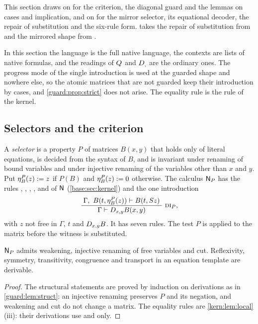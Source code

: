 This section draws on  for the criterion, the diagonal
guard and the lemmas on cases and implication, and on 
for the mirror selector, its equational decoder, the repair of
substitution and the six-rule form.   takes the repair of
substitution from  and the mirrored shape from
.

In this section the language is the full native language, the contexts are
lists of native formulas, and the readings of $Q_{}$ and $D_{,}$ are the
ordinary ones.  The progress mode of the single introduction is used at the
guarded shape and nowhere else, so the atomic matrices that are not guarded
keep their introduction by cases, and \cref{guard:prop:strict} does not
arise.  The equality rule is the rule  of the kernel.

\subsection{Selectors and the criterion}

\begin{definition}[Selector]
\label{guard:def:selector}
A \emph{selector} is a property $P$ of matrices $B(x,y)$ that holds only of
literal equations, is decided from the syntax of $B$, and is invariant under
renaming of bound variables and under injective renaming of the variables
other than $x$ and $y$.  Put $\eta^{P}_B(z)\mathrel{:=} z$ if $P(B)$ and
$\eta^{P}_B(z)\mathrel{:=} 0$ otherwise.  The calculus $\mathsf{N}_P$ has the rules
, , , , 
and  of $\mathsf{N}$ (\cref{base:sec:kernel}) and the one
introduction
\[
 \infrule{\Gamma,\ B(t,\eta^{P}_B(z))\proves B(t,\Suc z)}
         {\Gamma\proves\D{x}{y}B(x,y)}\ \rulename{DI}_{P},
\]
with $z$ not free in $\Gamma$, $t$ and $D_{x,y}B$.  It has seven rules.
The test $P$ is applied to the matrix before the witness is substituted.
\end{definition}

\begin{lemma}
\label{guard:lem:np-struct}
$\mathsf{N}_P$ admits weakening, injective renaming of free variables and cut.
Reflexivity, symmetry, transitivity, congruence and transport in an equation
template are derivable.
\end{lemma}

\begin{proof}
The structural statements are proved by induction on derivations as in
\cref{guard:lem:struct}: an injective renaming preserves $P$ and its
negation, and weakening and cut do not change a matrix.  The equality rules
are \cref{kern:lem:local}(iii): their derivations use  and
 only.
\end{proof}

